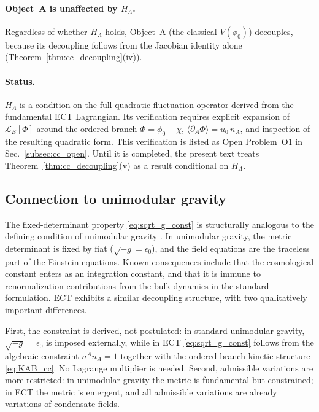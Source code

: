 \paragraph{Object~A is unaffected by $H_\Lambda$.} Regardless of whether $H_\Lambda$
holds, Object~A (the classical $V(\phi_0)$) decouples, because its
decoupling follows from the Jacobian identity alone (Theorem~\ref{thm:cc_decoupling}(iv)).
\paragraph{Status.} $H_\Lambda$ is a condition on the full quadratic
fluctuation operator derived from the fundamental ECT Lagrangian. Its
verification requires explicit expansion of $\mathcal{L}_E[\Phi]$
around the ordered branch $\Phi = \phi_0 + \chi$, $\langle \partial_A
\Phi\rangle = u_0\, n_A$, and inspection of the resulting quadratic
form. This verification is listed as Open Problem~O1 in
Sec.~\ref{subsec:cc_open}. Until it is completed, the present text
treats Theorem~\ref{thm:cc_decoupling}(v) as a result conditional on $H_\Lambda$.


\subsection{Connection to unimodular gravity}
\label{subsec:unimodular_cc}

The fixed-determinant property \eqref{eq:sqrt_g_const} is structurally
analogous to the defining condition of unimodular gravity
\cite{HenneauxTeitelboim1989,Alvarez2005,PadillaSaltas2015}. In
unimodular gravity, the metric determinant is fixed by fiat
($\sqrt{-g} = \epsilon_0$), and the field equations are the traceless
part of the Einstein equations. Known consequences
\cite{NgVanDam1990,Smolin2009} include that the cosmological constant
enters as an integration constant, and that it is immune to
renormalization contributions from the bulk dynamics in the standard
formulation. ECT exhibits a similar decoupling structure, with two
qualitatively important differences.

First, the constraint is derived, not postulated: in standard
unimodular gravity, $\sqrt{-g} = \epsilon_0$ is imposed externally,
while in ECT \eqref{eq:sqrt_g_const} follows from the algebraic
constraint $n^A n_A = 1$ together with the ordered-branch kinetic
structure \eqref{eq:KAB_cc}. No Lagrange multiplier is needed. Second,
admissible variations are more restricted: in unimodular gravity the
metric is fundamental but constrained; in ECT the metric is emergent,
and all admissible variations are already variations of condensate
fields.

